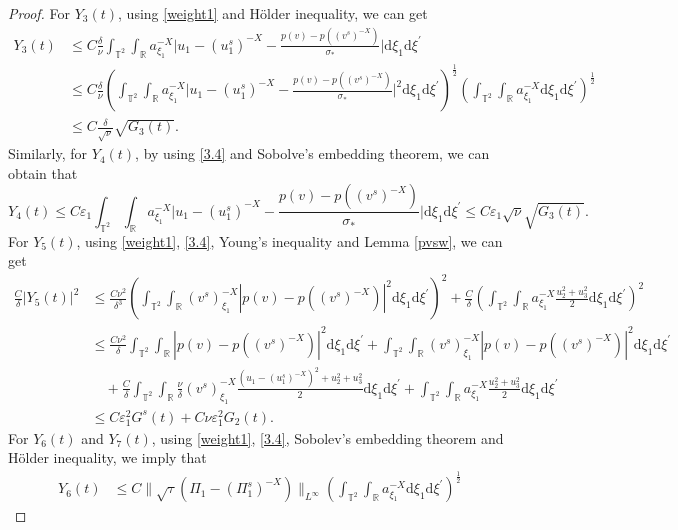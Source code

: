 \documentclass[10pt,reqno]{amsart}
\numberwithin{equation}{section}
\newcommand{\dif}{\mathrm{d}}
\begin{document}
\begin{proof}
For $Y_3(t)$, using \eqref{weight1} and H\"older inequality, we can get
 \begin{align*}
Y_3(t)&\le C\frac{\delta}{\nu}\int_{\mathbb{T}^2}\int_{\mathbb{R}}a^{-X}_{\xi_1}
\Big|u_1-(u_1^s)^{-X}-\frac{p(v)-p((v^s)^{-X})}{\sigma_\ast}\Big|\dif \xi_1\dif\xi^{\prime}\\
&\le C\frac{\delta}{\nu}\left(\int_{\mathbb{T}^2}\int_{\mathbb{R}}a^{-X}_{\xi_1}
\Big|u_1-(u_1^s)^{-X}-\frac{p(v)-p((v^s)^{-X})}{\sigma_\ast}\Big|^2\dif \xi_1\dif\xi^{\prime}\right)^{\frac{1}{2}}
\left(\int_{\mathbb{T}^2}\int_{\mathbb{R}}a^{-X}_{\xi_1}\dif \xi_1\dif\xi^{\prime}\right)^{\frac{1}{2}}\\
&\le C\frac{\delta}{\sqrt{\nu}}\sqrt{G_3(t)}.
\end{align*}
Similarly, for $Y_4(t)$, by using \eqref{3.4} and Sobolve's embedding theorem, we can obtain that
\[
Y_4(t)\le C\varepsilon_1\int_{\mathbb{T}^2}\int_{\mathbb{R}}a^{-X}_{\xi_1}
\Big|u_1-(u_1^s)^{-X}-\frac{p(v)-p((v^s)^{-X})}{\sigma_\ast}\Big|\dif \xi_1\dif\xi^{\prime}
\le C\varepsilon_1\sqrt{\nu}\sqrt{G_3(t)}.
\]
For $Y_5(t)$, using \eqref{weight1}, \eqref{3.4}, Young's inequality and Lemma \ref{pvsw}, we can get
\begin{align*}
\frac{C}{\delta}|Y_5(t)|^2&\le \frac{C\nu^2}{\delta^3}\left(\int_{\mathbb{T}^2}\int_{\mathbb{R}}(v^s)^{-X}_{\xi_1}|p(v)-p((v^s)^{-X})|^2\dif \xi_1\dif \xi^{\prime}\right)^2
+\frac{C}{\delta}
\left(\int_{\mathbb{T}^2}\int_{\mathbb{R}}a^{-X}_{\xi_1}
\frac{u_2^2+u_3^2}{2}\dif \xi_1\dif\xi^{\prime}\right)^2\\
&\le \frac{C\nu^2}{\delta}
\int_{\mathbb{T}^2}\int_{\mathbb{R}}|p(v)-p((v^s)^{-X})|^2\dif \xi_1\dif \xi^{\prime}
+\int_{\mathbb{T}^2}\int_{\mathbb{R}}(v^s)^{-X}_{\xi_1}|p(v)-p((v^s)^{-X})|^2\dif \xi_1\dif \xi^{\prime}
\\
&\quad+\frac{C}{\delta}
\int_{\mathbb{T}^2}\int_{\mathbb{R}}\frac{\nu}{\delta}(v^s)^{-X}_{\xi_1}
\frac{(u_1-(u_1^s)^{-X})^2+u_2^2+u_3^2}{2}\dif \xi_1\dif\xi^{\prime}
+\int_{\mathbb{T}^2}\int_{\mathbb{R}}a^{-X}_{\xi_1}
\frac{u_2^2+u_3^2}{2}\dif \xi_1\dif\xi^{\prime}\\
&\le C\varepsilon_1^2G^s(t)+C\nu\varepsilon_1^2G_2(t).
\end{align*}
For $Y_6(t)$ and $Y_7(t)$, using \eqref{weight1}, \eqref{3.4}, Sobolev's embedding theorem and H\"older inequality, we imply that
\begin{align*}
Y_6(t)&\le C\|\sqrt{\tau}(\Pi_1-(\Pi_1^s)^{-X})\|_{L^\infty}
\left(\int_{\mathbb{T}^2}\int_{\mathbb{R}}a^{-X}_{\xi_1}\dif \xi_1\dif\xi^{\prime}\right)^{\frac{1}{2}}

\end{align*}
\end{proof}
\end{document}
